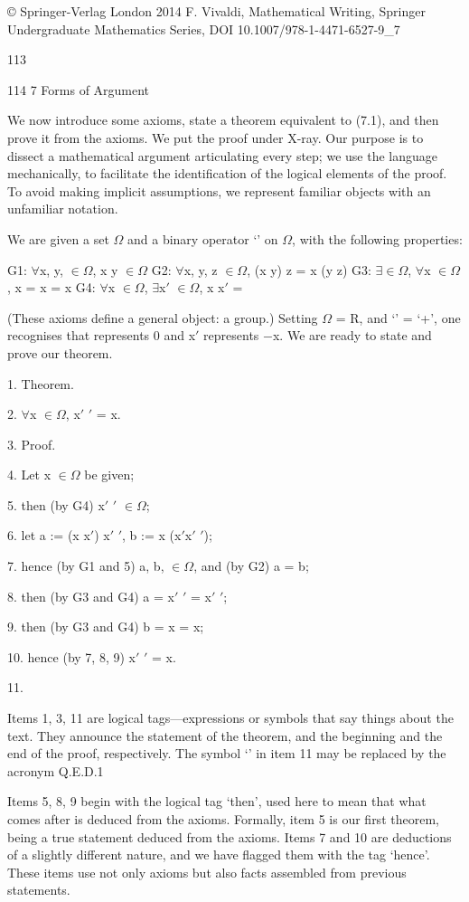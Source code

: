 \documentclass[11pt]{article}
\theoremstyle{plain}
\theoremstyle{definition}
\begin{document}
© Springer-Verlag London 2014 F. Vivaldi, Mathematical Writing, Springer Undergraduate Mathematics Series, DOI 10.1007/978-1-4471-6527-9\_7

113

114 7 Forms of Argument

We now introduce some axioms, state a theorem equivalent to (7.1), and then prove it from the axioms. We put the proof under X-ray. Our purpose is to dissect a mathematical argument articulating every step; we use the language mechanically, to facilitate the identification of the logical elements of the proof. To avoid making implicit assumptions, we represent familiar objects with an unfamiliar notation.

We are given a set $\Omega$ and a binary operator `' on $\Omega$, with the following properties:

G1: $\forall$x, y, $\in$$\Omega$, x y $\in$$\Omega$ G2: $\forall$x, y, z $\in$$\Omega$, (x y) z = x (y z) G3: $\exists$$\in$$\Omega$, $\forall$x $\in$$\Omega$, x = x = x G4: $\forall$x $\in$$\Omega$, $\exists$x$'$ $\in$$\Omega$, x x$'$ = 

(These axioms define a general object: a group.) Setting $\Omega$ = R, and `' = `+', one recognises that represents 0 and x$'$ represents $-$x. We are ready to state and prove our theorem.

1. Theorem.

2. $\forall$x $\in$$\Omega$, x$'$ $'$ = x.

3. Proof.

4. Let x $\in$$\Omega$ be given;

5. then (by G4) x$'$ $'$ $\in$$\Omega$;

6. let a := (x x$'$) x$'$ $'$, b := x (x$'$x$'$ $'$);

7. hence (by G1 and 5) a, b, $\in$$\Omega$, and (by G2) a = b;

8. then (by G3 and G4) a = x$'$ $'$ = x$'$ $'$;

9. then (by G3 and G4) b = x = x;

10. hence (by 7, 8, 9) x$'$ $'$ = x.

11. 

Items 1, 3, 11 are logical tags---expressions or symbols that say things about the text. They announce the statement of the theorem, and the beginning and the end of the proof, respectively. The symbol `' in item 11 may be replaced by the acronym Q.E.D.1

Items 5, 8, 9 begin with the logical tag `then', used here to mean that what comes after is deduced from the axioms. Formally, item 5 is our first theorem, being a true statement deduced from the axioms. Items 7 and 10 are deductions of a slightly different nature, and we have flagged them with the tag `hence'. These items use not only axioms but also facts assembled from previous statements.
\end{document}
